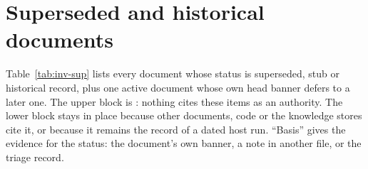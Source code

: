 \section{Superseded and historical documents}\label{sec:inv-superseded}

Table~\ref{tab:inv-sup} lists every document whose status is superseded, stub or historical record, plus one active document whose own head banner defers to a later one. The upper block is : nothing cites these items as an authority. The lower block stays in place because other documents, code or the knowledge stores cite it, or because it remains the record of a dated host run. ``Basis'' gives the evidence for the status: the document's own banner, a note in another file, or the triage record.

